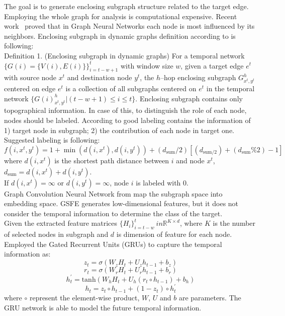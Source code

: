 \documentclass{article}
\newcommand\tab[1][0.5cm]{\hspace*{#1}}
\begin{document}
The goal is to generate enclosing subgraph structure related to the target edge. Employing the whole graph for analysis is computational expensive. Recent work~\cite{DBLP:journals/corr/abs-1806-03536} proved that in Graph Neural Networks each node is most influenced by its neighbors. Enclosing subgraph in dynamic graphs definition according to \cite{DBLP:journals/corr/abs-2005-07427} is following:\\
\tab Definition 1. (Enclosing subgraph in dynamic graphs) For a temporal network $\{G(i) = \{V(i), E(i)\}\}^t_{i = t-w+1}$ with window size $w$, given a target edge $e^t$ with source node $x^t$ and destination node $y^t$, the $h$--hop enclosing subgraph $G^h_{x^t, y^t}$ centered on edge $e^t$ is a collection of all subgraphs centered on $e^t$ in the temporal network $\{G(i)^h_{x^t, y^t}|(t-w+1)\leq i\leq t \}$. Enclosing subgraph contains only topographical information. In case of this, to distinguish the role of each node, nodes should be labeled. According to \cite{DBLP:journals/corr/abs-2005-07427} good labeling contains the information of 1) target node in subgraph; 2) the contribution of each node in target one.\\
Suggested labeling is following:
\begin{equation}
    f(i,x^t,y^t) = 1 + \min(d(i, x^t), d(i,y^t)) + (d_{\text{sum}}/2)[(d_{\text{sum}/2}) + (d_{\text{sum}}\%2) - 1]
\end{equation}
where $d(i, x^t)$ is the shortest path distance between $i$ and node $x^t$, $d_{\text{sum}} = d(i, x^t) + d(i, y^t)$.\\
If $d(i, x^t) = \infty$ or $d(i, y^t) = \infty$, node $i$ is labeled with 0.
\\
Graph Convolution Neural Network from \cite{kipf2017semisupervised} map the subgraph space into embedding space.
GSFE generates low-dimensional features, but it does not consider the temporal information to determine the class of the target.\\
Given the extracted feature matrices $\{H_i\}^t_{i = t-w } \ in \mathbb{R}^{K\times d}$, where $K$ is the number of selected nodes in subgraph and $d$ is dimension of feature for each node.\\
Employed the Gated Recurrent Units (GRUs) \cite{DBLP:journals/corr/ChungGCB14} to capture the temporal information as: 
\begin{equation}
    z_t = \sigma(W_zH_t + U_zh_{t-1} + b_z)
\end{equation}
\begin{equation}
    r_t = \sigma(W_rH_t + U_rh_{t-1} + b_r)
\end{equation}
\begin{equation}
    h^{'}_{t} = \text{tanh}(W_hH_t + U_h(r_t \circ h_{t-1}) + b_h)
\end{equation}
\begin{equation}
    h_t = z_t \circ h_{t-1} + (1-z_t) \circ h^{'}_{t}
\end{equation}
where $\circ$ represent the element-wise product, $W$, $U$ and $b$ are parameters. The GRU network is able to model the future temporal information.
\end{document}
